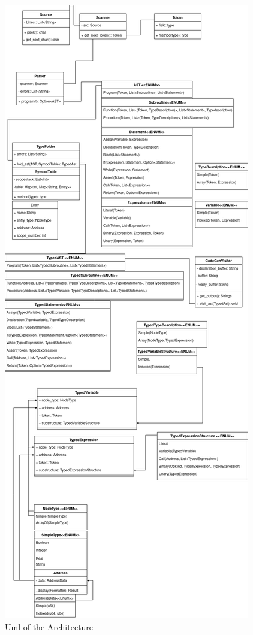 \documentclass[12pt,a4paper]{article}
\begin{document}
\begin{figure}
  \caption{Uml of the Architecture}\label{uml}
  \includegraphics[scale=0.3]{ast}
\end{figure}
\end{document}
